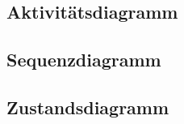 \subsection{Aktivitätsdiagramm}
\label{sec:Aktivitaetsdiagramm}

\subsection{Sequenzdiagramm}
\label{sec:Sequenzdiagramm}

\subsection{Zustandsdiagramm}
\label{sec:Zustandsdiagramm}